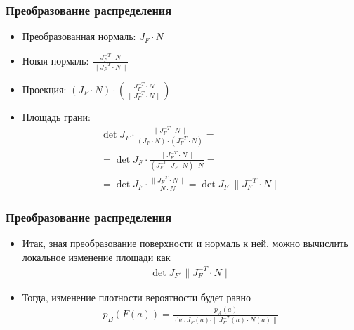 \documentclass[10pt]{beamer}
\begin{document}
\begin{frame}
\frametitle{Преобразование распределения}
\begin{itemize}
\item Преобразованная нормаль: \begin{math}J_F \cdot N\end{math}
\pause
\item Новая нормаль: \begin{math}\frac{J_F^{-T}\cdot N}{\|J_F^{-T}\cdot N\|}\end{math}
\pause
\item Проекция: \begin{math}(J_F\cdot N) \cdot \left(\frac{J_F^{-T}\cdot N}{\|J_F^{-T}\cdot N\|}\right)\end{math}
\pause
\item Площадь грани:
\begin{gather*}
\det J_F \cdot \frac{\|J_F^{-T}\cdot N\|}{(J_F\cdot N) \cdot (J_F^{-T}\cdot N)} = \\
= \det J_F \cdot \frac{\|J_F^{-T}\cdot N\|}{(J_F^{-1} \cdot J_F\cdot N) \cdot N} = \\
= \det J_F \cdot \frac{\|J_F^{-T}\cdot N\|}{N \cdot N} = \det J_F \cdot \|J_F^{-T}\cdot N\|
\end{gather*}
\end{itemize}
\end{frame}

\begin{frame}
\frametitle{Преобразование распределения}
\begin{itemize}
\item Итак, зная преобразование поверхности и нормаль к ней, можно вычислить локальное изменение площади как
\begin{gather*}
\det J_F \cdot \|J_F^{-T}\cdot N\|
\end{gather*}
\pause
\item Тогда, изменение плотности вероятности будет равно
\begin{gather*}
p_B(F(a)) = \frac{p_A(a)}{\det J_F(a) \cdot \|J_F^{-T}(a)\cdot N(a)\|}
\end{gather*}
\end{itemize}
\end{frame}
\end{document}
